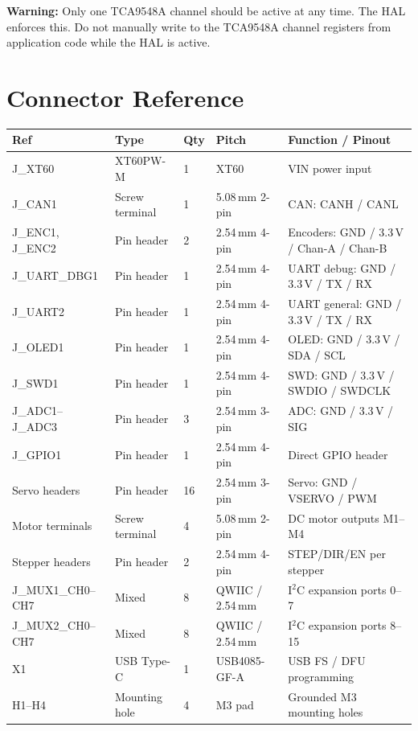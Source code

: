 \documentclass[11pt,a4paper]{article}
\begin{document}
\begin{warningbox}
\textbf{Warning:} Only one TCA9548A channel should be active at any time. The HAL enforces this. Do not manually write to the TCA9548A channel registers from application code while the HAL is active.
\end{warningbox}

\section{Connector Reference}

\begin{longtable}{p{3cm} p{2.5cm} p{1.5cm} p{2.5cm} p{5cm}}
  \toprule
  \rowcolor{headergray}\color{white}\textbf{Ref} &
  \color{white}\textbf{Type} &
  \color{white}\textbf{Qty} &
  \color{white}\textbf{Pitch} &
  \color{white}\textbf{Function / Pinout} \\
  \midrule\endhead
  J\_XT60             & XT60PW-M      & 1  & XT60       & VIN power input \\
  J\_CAN1             & Screw terminal& 1  & 5.08\,mm 2-pin & CAN: CANH / CANL \\
  J\_ENC1, J\_ENC2    & Pin header    & 2  & 2.54\,mm 4-pin & Encoders: GND / 3.3\,V / Chan-A / Chan-B \\
  J\_UART\_DBG1       & Pin header    & 1  & 2.54\,mm 4-pin & UART debug: GND / 3.3\,V / TX / RX \\
  J\_UART2            & Pin header    & 1  & 2.54\,mm 4-pin & UART general: GND / 3.3\,V / TX / RX \\
  J\_OLED1            & Pin header    & 1  & 2.54\,mm 4-pin & OLED: GND / 3.3\,V / SDA / SCL \\
  J\_SWD1             & Pin header    & 1  & 2.54\,mm 4-pin & SWD: GND / 3.3\,V / SWDIO / SWDCLK \\
  J\_ADC1--J\_ADC3    & Pin header    & 3  & 2.54\,mm 3-pin & ADC: GND / 3.3\,V / SIG \\
  J\_GPIO1            & Pin header    & 1  & 2.54\,mm 4-pin & Direct GPIO header \\
  Servo headers       & Pin header    & 16 & 2.54\,mm 3-pin & Servo: GND / VSERVO / PWM \\
  Motor terminals     & Screw terminal& 4  & 5.08\,mm 2-pin & DC motor outputs M1--M4 \\
  Stepper headers     & Pin header    & 2  & 2.54\,mm 4-pin & STEP/DIR/EN per stepper \\
  J\_MUX1\_CH0--CH7  & Mixed         & 8  & QWIIC / 2.54\,mm & I$^2$C expansion ports 0--7 \\
  J\_MUX2\_CH0--CH7  & Mixed         & 8  & QWIIC / 2.54\,mm & I$^2$C expansion ports 8--15 \\
  X1                  & USB Type-C    & 1  & USB4085-GF-A & USB FS / DFU programming \\
  H1--H4              & Mounting hole & 4  & M3 pad       & Grounded M3 mounting holes \\
  \bottomrule
\end{longtable}
\end{document}
